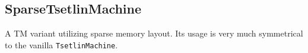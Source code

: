 \documentclass[english]{aghengthesis} %
\begin{document}





\subsection{SparseTsetlinMachine}
A TM variant utilizing sparse memory layout. Its usage is very much symmetrical to the vanilla \texttt{TsetlinMachine}.




\end{document}
